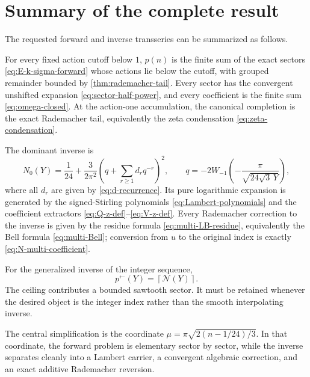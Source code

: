 \documentclass[11pt]{article}
\numberwithin{equation}{section}
\theoremstyle{mainthm}
\theoremstyle{defstyle}
\theoremstyle{remark}
\newcommand{\ceil}[1]{\left\lceil#1\right\rceil}
\newcommand{\Ncal}{\mathcal N}
\begin{document}
\section{Summary of the complete result}\label{sec:summary}

The requested forward and inverse transseries can be summarized as follows.

\begin{resultbox}
For every fixed action cutoff below \(1\), \(p(n)\) is the finite sum of the exact sectors \eqref{eq:E-k-sigma-forward} whose actions lie below the cutoff, with grouped remainder bounded by \cref{thm:rademacher-tail}.  Every sector has the convergent unshifted expansion \eqref{eq:sector-half-power}, and every coefficient is the finite sum \eqref{eq:omega-closed}.  At the action-one accumulation, the canonical completion is the exact Rademacher tail, equivalently the zeta condensation \eqref{eq:zeta-condensation}.
\end{resultbox}

\begin{resultbox}
The dominant inverse is
\[
 N_0(Y)=\frac1{24}+\frac{3}{2\pi^2}
 \left(q+\sum_{r\ge1}d_rq^{-r}\right)^2,
 \qquad
 q=-2W_{-1}\!\left(-\frac{\pi}{\sqrt{24\sqrt3\,Y}}\right),
\]
where all \(d_r\) are given by \eqref{eq:d-recurrence}.  Its pure logarithmic expansion is generated by the signed-Stirling polynomials \eqref{eq:Lambert-polynomials} and the coefficient extractors \eqref{eq:Q-z-def}--\eqref{eq:V-z-def}.  Every Rademacher correction to the inverse is given by the residue formula \eqref{eq:multi-LB-residue}, equivalently the Bell formula \eqref{eq:multi-Bell}; conversion from \(u\) to the original index is exactly \eqref{eq:N-multi-coefficient}.
\end{resultbox}

\begin{resultbox}
For the generalized inverse of the integer sequence,
\[
 p^{\leftarrow}(Y)=\ceil{\Ncal(Y)}.
\]
The ceiling contributes a bounded sawtooth sector.  It must be retained whenever the desired object is the integer index rather than the smooth interpolating inverse.
\end{resultbox}

The central simplification is the coordinate \(\mu=\pi\sqrt{2(n-1/24)/3}\).  In that coordinate, the forward problem is elementary sector by sector, while the inverse separates cleanly into a Lambert carrier, a convergent algebraic correction, and an exact additive Rademacher reversion.
\end{document}
